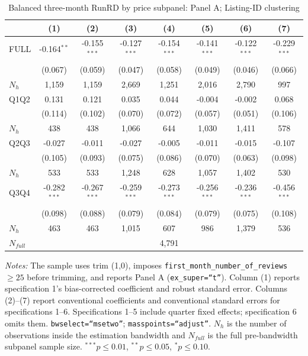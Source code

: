 \begin{table}[!htbp]
\centering
\caption{Balanced three-month RunRD by price subpanel: Panel A; Listing-ID clustering}
\scriptsize
\setlength{\tabcolsep}{5pt}
\begin{tabular}{l*{7}{c}}
\toprule
 & (1) & (2) & (3) & (4) & (5) & (6) & (7) \\
\midrule
FULL & -0.164$^{**}$ & -0.155$^{***}$ & -0.127$^{***}$ & -0.154$^{***}$ & -0.141$^{***}$ & -0.122$^{***}$ & -0.229$^{***}$ \\
 & (0.067) & (0.059) & (0.047) & (0.058) & (0.049) & (0.046) & (0.066) \\
$N_h$ & 1,159 & 1,159 & 2,669 & 1,251 & 2,016 & 2,790 & 997 \\
\addlinespace
Q1Q2 & 0.131 & 0.121 & 0.035 & 0.044 & -0.004 & -0.002 & 0.068 \\
 & (0.114) & (0.102) & (0.070) & (0.072) & (0.057) & (0.051) & (0.106) \\
$N_h$ & 438 & 438 & 1,066 & 644 & 1,030 & 1,411 & 578 \\
\addlinespace
Q2Q3 & -0.027 & -0.011 & -0.027 & -0.005 & -0.011 & -0.015 & -0.107 \\
 & (0.105) & (0.093) & (0.075) & (0.086) & (0.070) & (0.063) & (0.098) \\
$N_h$ & 533 & 533 & 1,248 & 628 & 1,057 & 1,402 & 530 \\
\addlinespace
Q3Q4 & -0.282$^{***}$ & -0.267$^{***}$ & -0.259$^{***}$ & -0.273$^{***}$ & -0.256$^{***}$ & -0.236$^{***}$ & -0.456$^{***}$ \\
 & (0.098) & (0.088) & (0.079) & (0.084) & (0.079) & (0.075) & (0.108) \\
$N_h$ & 463 & 463 & 1,015 & 607 & 986 & 1,379 & 536 \\

\midrule
$N_{full}$ & \multicolumn{7}{c}{4,791} \\
\bottomrule
\end{tabular}
\begin{minipage}{0.98\textwidth}
\footnotesize
\textit{Notes:} The sample uses trim (1,0), imposes \texttt{first\_month\_number\_of\_reviews}$\geq25$ before trimming, and reports Panel A (\texttt{ex\_super=``t''}). Column (1) reports specification 1's bias-corrected coefficient and robust standard error. Columns (2)--(7) report conventional coefficients and conventional standard errors for specifications 1--6. Specifications 1--5 include quarter fixed effects; specification 6 omits them. \texttt{bwselect=``msetwo''}; \texttt{masspoints=``adjust''}. $N_h$ is the number of observations inside the estimation bandwidth and $N_{full}$ is the full pre-bandwidth subpanel sample size. $^{***}p\leq0.01$, $^{**}p\leq0.05$, $^{*}p\leq0.10$.
\end{minipage}
\end{table}
\clearpage

